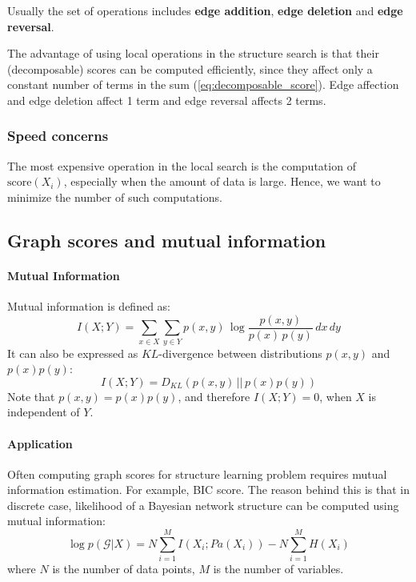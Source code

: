 \documentclass{article}
\newcommand{\score}[1]{\textrm{score}(#1)}
\newcommand{\graph}[1]{\mathcal{#1}}
\begin{document}
Usually the set of operations includes \textbf{edge addition}, \textbf{edge deletion} and \textbf{edge reversal}. 

The advantage of using local operations in the structure search is that their (decomposable) scores can be computed efficiently, since they affect only a constant number of terms in the sum (\ref{eq:decomposable_score}). Edge affection and edge deletion affect 1 term and edge reversal affects 2 terms.

\subsubsection{Speed concerns}
The most expensive operation in the local search is the computation of $\score{X_i}$, especially when the amount of data is large. Hence, we want to minimize the number of such computations.

\subsection{Graph scores and mutual information}
\paragraph{Mutual Information} Mutual information is defined as:
\begin{equation}
I(X; Y) = \sum_{x \in X}{\sum_{y \in Y}{p(x, y)\,\log \frac{p(x,y)}{p(x)\,p(y)}\,dx\,dy}}
\end{equation}
It can also be expressed as $KL$-divergence between distributions $p(x, y)$ and $p(x)p(y)$:
\begin{equation}
I(X; Y) = D_{KL}(p(x, y)\,||\,p(x)p(y))
\end{equation}
Note that $p(x, y) = p(x)p(y)$, and therefore $I(X; Y) = 0$, when $X$ is independent of $Y$. 

\paragraph{Application} Often computing graph scores for structure learning problem requires mutual information estimation. For example, BIC score. The reason behind this is that in discrete case, likelihood of a Bayesian network structure can be computed using mutual information:
\begin{equation}
\log p(\graph{G}|X) = N \sum_{i=1}^M{I(X_i; Pa(X_i))} - N \sum_{i=1}^M{H(X_i)}  
\end{equation}
where $N$ is the number of data points, $M$ is the number of variables.
\end{document}
